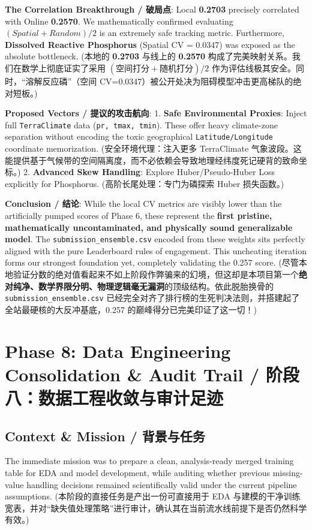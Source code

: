 \begin{infobox}
\textbf{The Correlation Breakthrough / 破局点}: Local \textbf{0.2703} precisely correlated with Online \textbf{0.2570}. We mathematically confirmed evaluating $(Spatial + Random) / 2$ is an extremely safe tracking metric. Furthermore, \textbf{Dissolved Reactive Phosphorus} (Spatial CV = 0.0347) was exposed as the absolute bottleneck. 
(本地的 \textbf{0.2703} 与线上的 \textbf{0.2570} 构成了完美映射关系。我们在数学上彻底证实了采用 $(空间打分+随机打分)/2$ 作为评估线极其安全。同时，“溶解反应磷”（空间 CV=0.0347）被公开处决为阻碍模型冲击更高梯队的绝对短板。)

\textbf{Proposed Vectors / 提议的攻击航向}:
1. \textbf{Safe Environmental Proxies}: Inject full \texttt{TerraClimate} data (\texttt{pr, tmax, tmin}). These offer heavy climate-zone separation without encoding the toxic geographical \texttt{Latitude/Longitude} coordinate memorization.
(安全环境代理：注入更多 TerraClimate 气象波段。这能提供基于气候带的空间隔离度，而不必依赖会导致地理经纬度死记硬背的致命坐标。)
2. \textbf{Advanced Skew Handling}: Explore Huber/Pseudo-Huber Loss explicitly for Phosphorus.
(高阶长尾处理：专门为磷探索 Huber 损失函数。)
\end{infobox}

\begin{infobox}
\textbf{Conclusion / 结论}: While the local CV metrics are visibly lower than the artificially pumped scores of Phase 6, these represent the \textbf{first pristine, mathematically uncontaminated, and physically sound generalizable model}. The \texttt{submission\_ensemble.csv} encoded from these weights sits perfectly aligned with the pure Leaderboard rules of engagement. This uncheating iteration forms our strongest foundation yet, completely validating the 0.257 score.
(尽管本地验证分数的绝对值看起来不如上阶段作弊骗来的幻境，但这却是本项目第一个\textbf{绝对纯净、数学界限分明、物理逻辑毫无漏洞}的顶级结构。依此脱胎换骨的 \texttt{submission\_ensemble.csv} 已经完全对齐了排行榜的生死判决法则，并搭建起了全站最硬核的大反冲基底，0.257 的巅峰得分已完美印证了这一切！)
\end{infobox}

\section{Phase 8: Data Engineering Consolidation \& Audit Trail / 阶段八：数据工程收敛与审计足迹}

\subsection{Context \& Mission / 背景与任务}
The immediate mission was to prepare a clean, analysis-ready merged training table for EDA and model development, while auditing whether previous missing-value handling decisions remained scientifically valid under the current pipeline assumptions.
(本阶段的直接任务是产出一份可直接用于 EDA 与建模的干净训练宽表，并对“缺失值处理策略”进行审计，确认其在当前流水线前提下是否仍然科学有效。)

